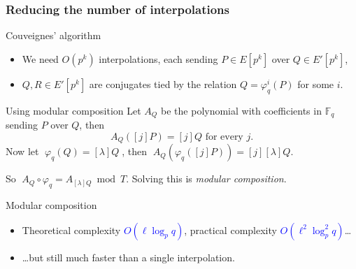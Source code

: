 \documentclass[10pt]{beamer}
\newcommand{\blue}[1]{\textcolor{blue}{#1}}  %
\newcommand{\F}{\mathbb{F}}  %
\newcommand{\frob}{\varphi}  %
\newcommand{\0}{\mathcal{O}}  %
\begin{document}

\begin{frame}
  \frametitle{Reducing the number of interpolations}

  \begin{block}{Couveignes' algorithm}
    \begin{itemize}
    \item We need $O(p^k)$ interpolations, each sending $P\in E[p^k]$
      over $Q\in E'[p^k]$,
    \item $Q,R\in E'[p^k]$ are conjugates tied by the relation
      $Q=\frob_q^i(P)$ for some $i$.
    \end{itemize}
  \end{block}

  \begin{block}{Using modular composition}
    Let $A_Q$ be the polynomial with coefficients in $\F_q$ sending
    $P$ over $Q$, then
    \[A_Q([j]P) = [j]Q \text{ for every $j$.}\]
    Now let $\;\frob_q(Q) = [\lambda]Q\;$, then $\;A_Q(\frob_q([j]P)) =
    [j][\lambda]Q$.

    So \alert{$\;A_Q\circ\frob_q = A_{[\lambda]Q} \bmod T$}. Solving this
    is \emph{modular composition}.
  \end{block}

  \begin{block}{Modular composition}
    \begin{itemize}
    \item Theoretical complexity \blue{$O(\ell\log_pq)$}, practical
      complexity \blue{$O(\ell^2\log_p^2q)$}\dots
    \item \dots but still much faster than a single interpolation.
    \end{itemize}
  \end{block}
\end{frame}

\end{document}

